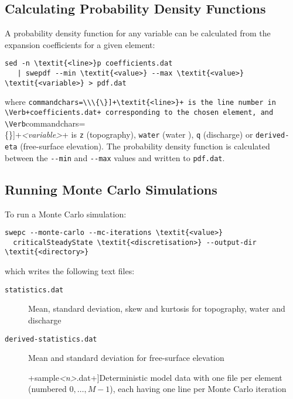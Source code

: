 \subsection{Calculating Probability Density Functions}
A probability density function for any variable can be calculated from the expansion coefficients for a given element:
\begin{Verbatim}[commandchars=\\\{\}]
sed -n \textit{<line>}p coefficients.dat
   | swepdf --min \textit{<value>} --max \textit{<value>} \textit{<variable>} > pdf.dat
\end{Verbatim}
where \Verb[commandchars=\\\{\}]+\textit{<line>}+ is the line number in \Verb+coefficients.dat+ corresponding to the chosen element, and \Verb[commandchars=\\\{\}]+\textit{<variable>}+ is \Verb+z+ (topography), \Verb+water+ (water ), \Verb+q+ (discharge) or \Verb+derived-eta+ (free-surface elevation).
The probability density function is calculated between the \Verb+--min+ and \Verb+--max+ values and written to \Verb+pdf.dat+. 

\subsection{Running Monte Carlo Simulations}
To run a Monte Carlo simulation:
\begin{Verbatim}[commandchars=\\\{\}]
swepc --monte-carlo --mc-iterations \textit{<value>}
  criticalSteadyState \textit{<discretisation>} --output-dir \textit{<directory>}
\end{Verbatim}
which writes the following text files:
\begin{description}
\item[\Verb+statistics.dat+]{Mean, standard deviation, skew and kurtosis for topography, water  and discharge}
\item[\Verb+derived-statistics.dat+]{Mean and standard deviation for free-surface elevation }
\cprotect\item[\Verb[commandchars=\\\{\}]+sample\textit{<n>}.dat+]{Deterministic model data with one file per element (numbered $0, \ldots, M-1$), each having one line per Monte Carlo iteration}
\end{description}